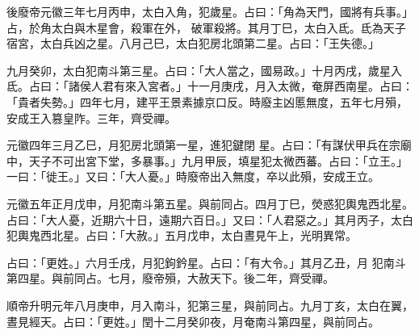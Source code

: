 \begin{pinyinscope}
 後廢帝元徽三年七月丙申，太白入角，犯歲星。占曰：「角為天門，國將有兵事。」占，於角太白與木星會，殺軍在外，
 破軍殺將。其月丁巳，太白入氐。氐為天子宿宮，太白兵凶之星。八月己巳，太白犯房北頭第二星。占曰：「王失德。」



 九月癸卯，太白犯南斗第三星。占曰：「大人當之，國易政。」十月丙戌，歲星入氐。占曰：「諸侯人君有來入宮者。」十一月庚戌，月入太微，奄屏西南星。占曰：「貴者失勢。」四年七月，建平王景素據京口反。時廢主凶慝無度，五年七月殞，安成王入篡皇阼。三年，齊受禪。



 元徽四年三月乙巳，月犯房北頭第一星，進犯鍵閉
 星。占曰：「有謀伏甲兵在宗廟中，天子不可出宮下堂，多暴事。」九月甲辰，填星犯太微西蕃。占曰：「立王。」一曰：「徙王。」又曰：「大人憂。」時廢帝出入無度，卒以此殞，安成王立。



 元徽五年正月戊申，月犯南斗第五星。與前同占。四月丁巳，熒惑犯輿鬼西北星。占曰：「大人憂，近期六十日，遠期六百日。」又曰：「人君惡之。」其月丙子，太白犯輿鬼西北星。占曰：「大赦。」五月戊申，太白晝見午上，光明異常。



 占曰：「更姓。」六月壬戌，月犯鉤鈐星。占曰：「有大令。」其月乙丑，月
 犯南斗第四星。與前同占。七月，廢帝殞，大赦天下。後二年，齊受禪。



 順帝升明元年八月庚申，月入南斗，犯第三星，與前同占。九月丁亥，太白在翼，晝見經天。占曰：「更姓。」閏十二月癸卯夜，月奄南斗第四星，與前同占。



\end{pinyinscope}